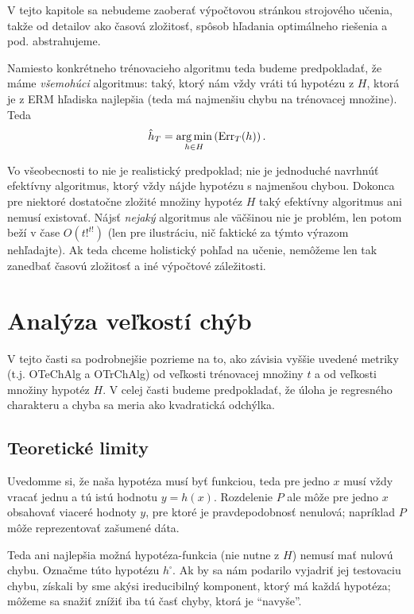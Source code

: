 V tejto kapitole sa nebudeme zaoberať výpočtovou stránkou strojového
učenia, takže od detailov ako časová zložitosť, spôsob hľadania
optimálneho riešenia a pod. abstrahujeme.

Namiesto konkrétneho trénovacieho algoritmu teda budeme predpokladať,
že máme \emph{všemohúci} algoritmus: taký, ktorý nám vždy vráti tú
hypotézu z $H$, ktorá je z ERM hľadiska najlepšia (teda má najmenšiu
chybu na trénovacej množine). Teda
$$ \hat{h}_T = \operatorname*{{arg\,min}}_{h \in H} \left( \mathrm{Err}_T(h) \right). $$

Vo všeobecnosti to nie je realistický predpoklad; nie je jednoduché
navrhnúť efektívny algoritmus, ktorý vždy nájde hypotézu s najmenšou
chybou. Dokonca pre niektoré dostatočne zložité množiny hypotéz $H$
taký efektívny algoritmus ani nemusí existovať. Nájsť \emph{nejaký}
algoritmus ale väčšinou nie je problém, len potom beží v čase $O(t!^{t!})$
(len pre ilustráciu, nič faktické za týmto výrazom nehľadajte). Ak teda
chceme holistický pohľad na učenie, nemôžeme len tak zanedbať časovú
zložitosť a iné výpočtové záležitosti.




\section{Analýza veľkostí chýb}

V tejto časti sa podrobnejšie pozrieme na to, ako závisia vyššie
uvedené metriky (t.j. OTeChAlg a OTrChAlg) od veľkosti trénovacej množiny
$t$ a od veľkosti množiny hypotéz $H$. V celej časti budeme predpokladať,
že úloha je regresného charakteru a chyba sa meria ako kvadratická odchýlka.



\subsection{Teoretické limity}

Uvedomme si, že naša hypotéza musí byť funkciou, teda pre jedno $x$
musí vždy vracať jednu a tú istú hodnotu $y = h(x)$. Rozdelenie $P$ ale
môže pre jedno $x$ obsahovať viaceré hodnoty $y$, pre ktoré je pravdepodobnosť
nenulová; napríklad $P$ môže reprezentovať zašumené dáta.

Teda ani najlepšia možná hypotéza-funkcia (nie nutne z $H$) nemusí
mať nulovú chybu. Označme túto hypotézu $h^\square$. Ak by sa nám
podarilo vyjadriť jej testovaciu chybu, získali by sme akýsi ireducibilný
komponent, ktorý má každá hypotéza; môžeme sa snažiť znížiť iba tú časť
chyby, ktorá je ``navyše''.

